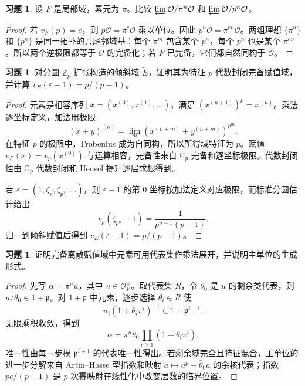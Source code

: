 \documentclass[11pt,a4paper,openany]{ctexbook}
\numberwithin{equation}{chapter}
\newcommand{\C}{\mathbb{C}}
\newcommand{\Z}{\mathbb{Z}}
\theoremstyle{plain}
\theoremstyle{definition}
\newtheorem{exercise}[theorem]{习题}
\theoremstyle{remark}
\begin{document}
\begin{exercise}
设 $F$ 是局部域，素元为 $\pi$。比较 $\varprojlim\mathcal O/\pi^n\mathcal O$ 和 $\varprojlim\mathcal O/p^n\mathcal O$。
\end{exercise}

\begin{proof}
若 $v_F(p)=e$，则 $p\mathcal O=\pi^e\mathcal O$ 乘以单位。因此 $p^n\mathcal O=\pi^{en}\mathcal O$。两组理想 $\{\pi^n\}$ 和 $\{p^n\}$ 是同一拓扑的共尾邻域基：每个 $\pi^m$ 包含某个 $p^n$，每个 $p^n$ 也是某个 $\pi^{en}$。所以两个逆极限都等于 $\mathcal O$ 的完备化；若 $F$ 已完备，它们都自然同构于 $\mathcal O$。
\end{proof}

\begin{exercise}
对分圆 $\Z_p$ 扩张构造的倾斜域 $\widetilde E$，证明其为特征 $p$ 代数封闭完备赋值域，并计算 $v_E(\varepsilon-1)=p/(p-1)$。
\end{exercise}

\begin{proof}
元素是相容序列 $x=(x^{(0)},x^{(1)},\ldots)$，满足 $(x^{(n+1)})^p=x^{(n)}$。乘法逐坐标定义，加法用极限
\[
  (x+y)^{(n)}=\lim_m(x^{(n+m)}+y^{(n+m)})^{p^m}.
\]
在特征 $p$ 的极限中，Frobenius 成为自同构，所以所得域特征为 $p$。赋值 $v_E(x)=v_p(x^{(0)})$ 与运算相容，完备性来自 $\C_p$ 完备和逐坐标极限。代数封闭性由 $\C_p$ 代数封闭和 Hensel 提升逐层求根得到。

若 $\varepsilon=(1,\zeta_p,\zeta_{p^2},\ldots)$，则 $\varepsilon-1$ 的第 $0$ 坐标按加法定义对应极限，而标准分圆估计给出
\[
  v_p(\zeta_{p^n}-1)=\frac1{p^{n-1}(p-1)}.
\]
归一到倾斜赋值后得到 $v_E(\varepsilon-1)=p/(p-1)$。
\end{proof}

\begin{exercise}
证明完备离散赋值域中元素可用代表集作乘法展开，并说明主单位的生成形式。
\end{exercise}

\begin{proof}
先写 $\alpha=\pi^nu$，其中 $u\in\mathcal O_F^\times$。取代表集 $R$，令 $\theta_0$ 是 $u$ 的剩余类代表，则 $u/\theta_0\in1+\mathfrak p$。对 $1+\mathfrak p$ 中元素，逐步选择 $\theta_i\in R$ 使
\[
  u_i(1+\theta_i\pi^i)^{-1}\in1+\mathfrak p^{i+1}.
\]
无限乘积收敛，得到
\[
  \alpha=\pi^n\theta_0\prod_{i\ge1}(1+\theta_i\pi^i).
\]
唯一性由每一步模 $\mathfrak p^{i+1}$ 的代表唯一性得出。若剩余域完全且特征混合，主单位的进一步分解来自 Artin--Hasse 型指数和映射 $a\mapsto a^p+\bar\theta_0a$ 的余核代表；指数 $pe/(p-1)$ 是 $p$ 次幂映射在线性化中改变层数的临界位置。
\end{proof}
\end{document}
